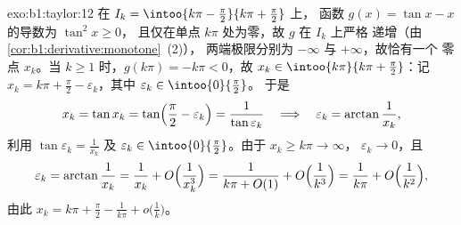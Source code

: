 \begin{solution}{exo:b1:taylor:12}
在 $I_k = \intoo{k\pi - \frac\pi2}{k\pi + \frac\pi2}$ 上，
函数 $g(x) = \tan x - x$ 的导数为 $\tan^2 x \geq 0$，
且仅在单点 $k\pi$ 处为零，故 $g$ 在 $I_k$ 上严格
递增（由\cref{cor:b1:derivative:monotone}~(2)），
两端极限分别为 $-\infty$ 与 $+\infty$，故恰有一个
零点 $x_k$。当 $k \geq 1$ 时，$g(k\pi) = -k\pi < 0$，故 $x_k \in
\intoo{k\pi}{k\pi + \frac\pi2}$：记 $x_k = k\pi + \frac\pi2 -
\varepsilon_k$，其中 $\varepsilon_k \in \intoo{0}{\frac\pi2}$。
于是
\[
x_k = \tan x_k = \tan\Bigl(\frac\pi2 - \varepsilon_k\Bigr)
= \frac{1}{\tan\varepsilon_k}
\quad\Longrightarrow\quad
\varepsilon_k = \arctan\frac{1}{x_k} ,
\]
利用 $\tan\varepsilon_k = \frac{1}{x_k}$ 及 $\varepsilon_k \in
\intoo{0}{\frac\pi2}$。由于 $x_k \geq k\pi \to \infty$，
$\varepsilon_k \to 0$，且
\[
\varepsilon_k = \arctan\frac{1}{x_k} = \frac{1}{x_k} +
O\Bigl(\frac{1}{x_k^3}\Bigr)
= \frac{1}{k\pi + O(1)} + O\Bigl(\frac{1}{k^3}\Bigr)
= \frac{1}{k\pi} + O\Bigl(\frac{1}{k^2}\Bigr) ,
\]
由此 $x_k = k\pi + \frac\pi2 - \frac{1}{k\pi} +
o\bigl(\frac1k\bigr)$。
\end{solution}

